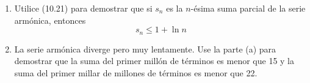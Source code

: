 \item 
    \begin{enumerate}
        \item[(a)] Utilice (10.21) para demostrar que si $s_n$ es la $n$-ésima suma parcial de la serie armónica, entonces
        \[ s_n \le 1 + \ln n \]
        \item[(b)] La serie armónica diverge pero muy lentamente. Use la parte (a) para demostrar que la suma del primer millón de términos es menor que 15 y la suma del primer millar de millones de términos es menor que 22.
    \end{enumerate}
